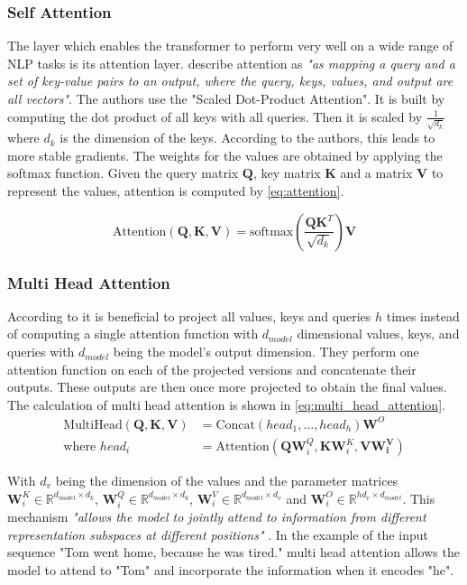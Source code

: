 \subsubsection{Self Attention}
The layer which enables the transformer to perform very well on a wide range of \ac{NLP} tasks is its attention layer.
\Textcite{Vaswani:2017} describe attention as \textit{"as mapping a query and a set of key-value pairs to an output, where the query, keys, values, and output are all vectors"}.
The authors use the "Scaled Dot-Product Attention".
It is built by computing the dot product of all keys with all queries.
Then it is scaled by $\frac{1}{\sqrt{d_k}}$ where $d_k$ is the dimension of the keys.
According to the authors, this leads to more stable gradients.
The weights for the values are obtained by applying the softmax function.
Given the query matrix $\bm{Q}$, key matrix $\bm{K}$ and a matrix $\bm{V}$ to represent the values, attention is computed by \cref{eq:attention}.


\begin{equation}\label{eq:attention}
    \text{Attention}(\bm{Q},\bm{K},\bm{V}) = \text{softmax}(\frac{\bm{Q}\bm{K}^T}{\sqrt{d_k}}) \bm{V}
\end{equation}

\subsubsection{Multi Head Attention}
According to \textcite{Vaswani:2017} it is beneficial to project all values, keys and queries $h$ times instead of computing a single attention function with $d_{model}$ dimensional values, keys, and queries with $d_{model}$ being the model's output dimension.
They perform one attention function on each of the projected versions and concatenate their outputs.
These outputs are then once more projected to obtain the final values.
The calculation of multi head attention is shown in \cref{eq:multi_head_attention}.
\begin{equation}\label{eq:multi_head_attention}
    \begin{aligned}
        \text{MultiHead}(\bm{Q},\bm{K},\bm{V}) &= \text{Concat}(head_1,\dots, head_h)\bm{W}^O\\
        \text{where }head_i &= \text{Attention}(\bm{Q}\bm{W}^Q_i, \bm{K}\bm{W}^K_i, \bm{V}\bm{W^V_i})
    \end{aligned}
\end{equation}

With $d_v$ being the dimension of the values and the parameter matrices $\bm{W}^K_i \in \mathbb{R}^{d_{model} \times d_k}$, $\bm{W}^Q_i \in \mathbb{R}^{d_{model} \times d_k}$, $\bm{W}^V_i \in \mathbb{R}^{d_{model} \times d_v}$ and $\bm{W}^O_i \in \mathbb{R}^{hd_v \times d_{model}}$.
This mechanism \textit{"allows the model to jointly attend to information from different representation subspaces at different positions"} \parencite{Vaswani:2017}.
In the example of the input sequence "Tom went home, because he was tired." multi head attention allows the model to attend to "Tom" and incorporate the information when it encodes "he".
